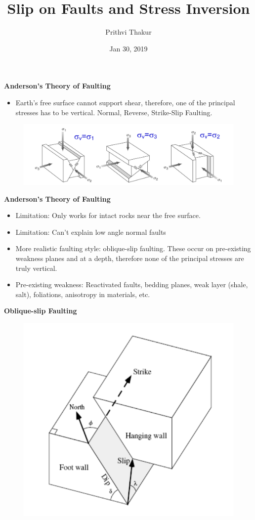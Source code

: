 \documentclass[11pt]{beamer}
\title{\textbf{Slip on Faults and Stress Inversion}}
\date{Jan 30, 2019}
\author{Prithvi Thakur}
\newcommand{\hl}[1]{\textcolor{myhl}{#1}}
\begin{document}
\maketitle

\linespread{1.3}

\begin{frame}{\textbf{Anderson's Theory of Faulting}}
    \begin{itemize}
        \item Earth's free surface cannot support shear, therefore, one of the principal stresses has to be vertical. \hl{Normal, Reverse, Strike-Slip Faulting}.
    \end{itemize}
    \begin{figure}
        \includegraphics[width=1\linewidth]{images/anderson}
    \end{figure}
\end{frame}

\begin{frame}{\textbf{Anderson's Theory of Faulting}}
    \begin{itemize}
        \item \hl{Limitation:} Only works for intact rocks near the free surface.
        \item \hl{Limitation:} Can't explain low angle normal faults
        \item More realistic faulting style: \hl{oblique-slip faulting}. These occur on pre-existing weakness planes and at a depth, therefore none of the principal stresses are truly vertical.
        \item \hl{Pre-existing weakness:} Reactivated faults, bedding planes, weak layer (shale, salt), foliations, anisotropy in materials, etc.
    \end{itemize}
\end{frame}

\begin{frame}{\textbf{Oblique-slip Faulting}}
    \begin{figure}
        \includegraphics[width=0.6\linewidth]{images/obliquefault}
    \end{figure}
\end{frame}
\end{document}
